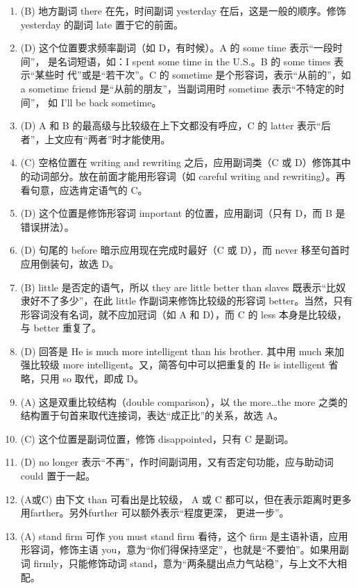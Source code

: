 \begin{enumerate}
\item (B) 地方副词 there 在先，时间副词 yesterday 在后，这是一般的顺序。修饰 yesterday 的副词 late 置于它的前面。
\item (D) 这个位置要求频率副词（如 D，有时候）。A 的 some time 表示“一段时间”，
  是名词短语，如：I spent some time in the U.S.。B 的 some times 表示“某些时
  代”或是“若干次”。C 的 sometime 是个形容词，表示“从前的”，如 a
  sometime friend 是“从前的朋友”，当副词用时 sometime 表示“不特定的时间”，
  如 I’ll be back sometime。
\item (D) A 和 B 的最高级与比较级在上下文都没有呼应，C 的 latter 表示“后者”，上文应有“两者”时才能使用。
\item (C) 空格位置在 writing and rewriting 之后，应用副词类（C 或 D）修饰其中的动词部分。放在前面才能用形容词（如 careful writing and rewriting）。再看句意，应选肯定语气的 C。
\item (D) 这个位置是修饰形容词 important 的位置，应用副词（只有 D，而 B 是错误拼法）。
\item (D) 句尾的 before 暗示应用现在完成时最好（C 或 D），而 never 移至句首时应用倒装句，故选 D。
\item (B) little 是否定的语气，所以 they are little better than slaves 既表示“比奴隶好不了多少”，在此 little 作副词来修饰比较级的形容词 better。当然，只有形容词没有名词，就不应加冠词（如 A 和 D），而 C 的 less 本身是比较级，与 better 重复了。
\item (D) 回答是 He is much more intelligent than his brother. 其中用 much 来加强比较级 more intelligent。又，简答句中可以把重复的 He is intelligent 省略，只用 so 取代，即成 D。
\item (A) 这是双重比较结构（double comparison），以 the more…the more 之类的结构置于句首来取代连接词，表达“成正比”的关系，故选 A。
\item (C) 这个位置是副词位置，修饰 disappointed，只有 C 是副词。
\item (D) no longer 表示“不再”，作时间副词用，又有否定句功能，应与助动词 could 置于一起。

\item (A或C) 由下文 than 可看出是比较级， A 或 C 都可以，但在表示距离时更多
  用farther。另外further 可以额外表示“程度更深，
  更进一步”。

\item (A) stand firm 可作 you must stand firm 看待，这个 firm 是主语补语，应用形容词，修饰主语 you，意为“你们得保持坚定”，也就是“不要怕”。如果用副词 firmly，只能修饰动词 stand，意为“两条腿出点力气站稳”，与上文不大相配。
\end{enumerate}

